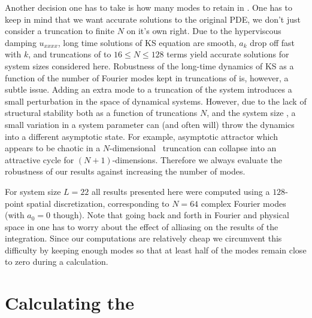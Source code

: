 Another decision one has to take is how many modes to retain in . One
has to keep in mind that we want accurate solutions to the original PDE, we don't just
consider a truncation to finite $N$ on it's own right. Due to the hyperviscous 
damping $u_{xxxx}$, long time solutions of KS
equation are smooth, $a_k$ drop off fast
with $k$, and truncations of  to $16 \leq N \leq 128$
terms yield accurate solutions for system sizes considered here.
Robustness of the long-time dynamics of KS as a function of the 
number of Fourier modes kept in truncations
of  is, however, a subtle issue.  Adding an extra mode to
a truncation of the system introduces a small perturbation in the
space of dynamical systems.  However, due to the lack of structural
stability both as a function of truncations $N$, and the system size
\tildeL, a small variation in a system parameter can (and often will)
throw the dynamics into a different asymptotic state.  For example,
asymptotic attractor which appears to be chaotic in a $N$-dimensional
\statesp\ truncation can collapse into an attractive cycle
for $(N\!+\!1)$-dimensions. Therefore we always evaluate the robustness
of our results against increasing the number of modes. 

For system size $L=22$ all results presented here were computed using
a $128$-point spatial discretization, corresponding to $N=64$ complex Fourier modes
(with $a_0=0$ though). Note that going back and forth in Fourier and physical
space in  one has to worry about the effect of alliasing
on the results of the integration. Since our computations are relatively cheap
we circumvent this difficulty by keeping enough modes so that at least half
of the modes remain close to zero during a calculation. 



% 

\section{Calculating the }

